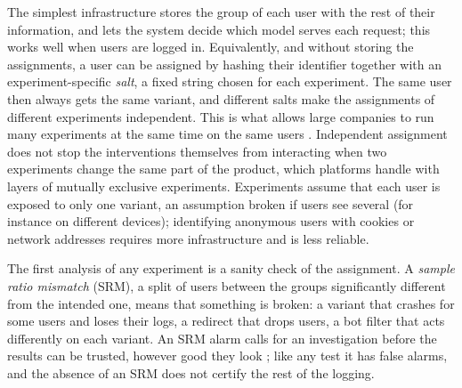 The simplest infrastructure stores the group of each user with the rest of their information, and lets the system decide which
model serves each request; this works well when users are logged in. Equivalently, and without storing the assignments, a user can be assigned by
hashing their identifier together with an experiment-specific \emph{salt}, a fixed string chosen for each experiment. The same user then always gets the same variant, and
different salts make the assignments of different experiments independent. This is what allows large companies to run many
experiments at the same time on the same users \citep{tang2010overlapping}. Independent assignment does not stop the
interventions themselves from interacting when two experiments change the same part of the product, which platforms
handle with layers of mutually exclusive experiments. Experiments assume that each user is exposed to only
one variant, an assumption broken if users see several (for instance on different devices); identifying anonymous users with
cookies or network addresses requires more infrastructure and is less reliable.

The first analysis of any experiment is a sanity check of the assignment. A \emph{sample ratio mismatch} (SRM), a split of users
between the groups significantly different from the intended one, means that something is broken: a variant that crashes for some
users and loses their logs, a redirect that drops users, a bot filter that acts differently on each variant. An SRM alarm calls
for an investigation before the results can be trusted, however good they look \citep{fabijan2019diagnosing}; like any
test it has false alarms, and the absence of an SRM does not certify the rest of the logging.

